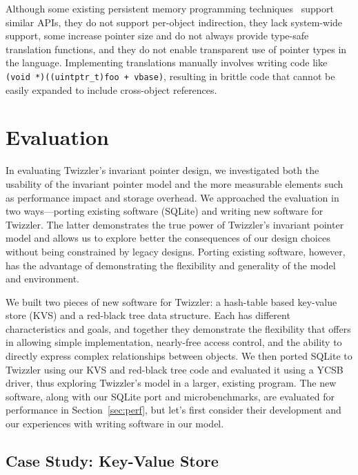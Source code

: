 {    Although some existing persistent memory programming
    techniques~\cite{libpmem,Chen:micro17,wang:micro17} support similar
    APIs, they do not support per-object indirection, they lack system-wide support,
    some increase pointer size and do not always provide
    type-safe translation functions, and they do not enable transparent use of pointer
    types in the language. Implementing translations manually involves writing code
    like
    \texttt{(void *)((uintptr\_t)foo + vbase)}, resulting in brittle code that
    cannot be easily expanded to include cross-object references.

}

\section{Evaluation}

In evaluating Twizzler's invariant pointer design, we investigated both the
usability of the invariant pointer model and the more measurable elements such as performance impact
and storage overhead. We approached the evaluation in two ways---porting existing software
(SQLite) and writing new software for Twizzler. The latter demonstrates the true power of
Twizzler's invariant pointer model and allows us to explore better the consequences of our design
choices without being constrained by legacy designs. Porting existing software, however, has the
advantage of demonstrating the flexibility and generality of the model and environment.

We built two pieces of new software for Twizzler: a hash-table based key-value store (KVS) and a red-black tree
data structure.  Each has different characteristics and goals, and together they demonstrate the flexibility that
\Twizzler offers in allowing simple implementation, nearly-free access control, and the ability to directly express
complex relationships between objects.  We then ported SQLite to Twizzler using
our KVS and red-black tree code and evaluated it using a YCSB~\cite{ycsb,ycsbc} driver, thus exploring Twizzler's
model in a larger, existing program. The new software, along with our SQLite port and
microbenchmarks, are evaluated for performance in Section~\ref{sec:perf}, but let's first consider their development and our experiences with writing software in our model.


\subsection{Case Study: Key-Value Store}

